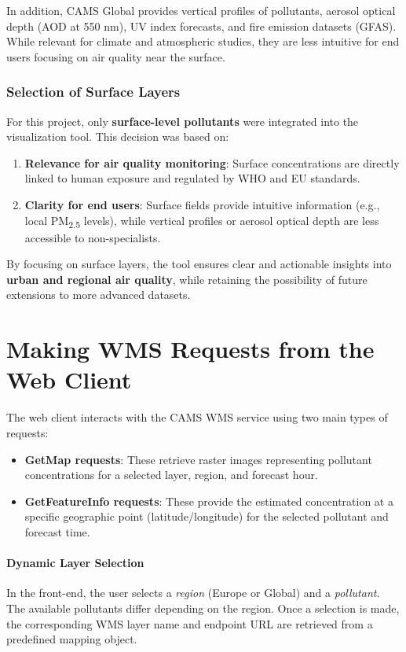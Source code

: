 In addition, CAMS Global provides vertical profiles of pollutants, aerosol optical depth (AOD at 550 nm), UV index forecasts, and fire emission datasets (GFAS).  
While relevant for climate and atmospheric studies, they are less intuitive for end users focusing on air quality near the surface.

\subsubsection{Selection of Surface Layers}
For this project, only \textbf{surface-level pollutants} were integrated into the visualization tool.  
This decision was based on:
\begin{enumerate}
	\item \textbf{Relevance for air quality monitoring}: Surface concentrations are directly linked to human exposure and regulated by WHO and EU standards.
	\item \textbf{Clarity for end users}: Surface fields provide intuitive information (e.g., local PM\textsubscript{2.5} levels), while vertical profiles or aerosol optical depth are less accessible to non-specialists.
\end{enumerate}

By focusing on surface layers, the tool ensures clear and actionable insights into \textbf{urban and regional air quality}, while retaining the possibility of future extensions to more advanced datasets.



\section{Making WMS Requests from the Web Client}

The web client interacts with the CAMS WMS service using two main types of requests:

\begin{itemize}
	\item \textbf{GetMap requests}: These retrieve raster images representing pollutant concentrations for a selected layer, region, and forecast hour. 
	\item \textbf{GetFeatureInfo requests}: These provide the estimated concentration at a specific geographic point (latitude/longitude) for the selected pollutant and forecast time.
\end{itemize}

\paragraph{Dynamic Layer Selection}
In the front-end, the user selects a \textit{region} (Europe or Global) and a \textit{pollutant}. The available pollutants differ depending on the region. Once a selection is made, the corresponding WMS layer name and endpoint URL are retrieved from a predefined mapping object.

